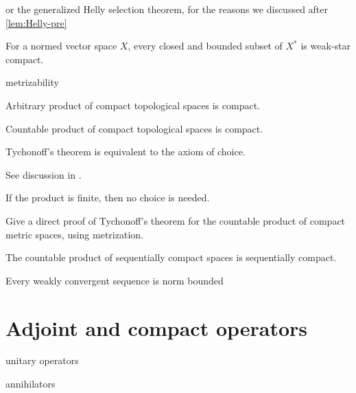 or the generalized Helly selection theorem, for the reasons we discussed after \cref{lem:Helly-pre}

\begin{namedthm}
    For a normed vector space $X$, every closed and bounded subset of $X^*$ is weak-star compact.
\end{namedthm}

metrizability

\begin{namedthm}
    Arbitrary product of compact topological spaces is compact.
\end{namedthm}

\begin{thm}
    Countable product of compact topological spaces is compact.
\end{thm}

Tychonoff's theorem is equivalent to the axiom of choice.

See discussion in  \cite[Section~4.8]{Herrlich_2006}.

If the product is finite, then no choice is needed.

\begin{xca}
    Give a direct proof of Tychonoff's theorem for the countable product of compact metric spaces, using metrization.
\end{xca}

\begin{thm}
    The countable product of sequentially compact spaces is sequentially compact.
\end{thm}

Every weakly convergent sequence is norm bounded

\section{Adjoint and compact operators}

unitary operators

annihilators

\begin{namedthm}
    
\end{namedthm}


